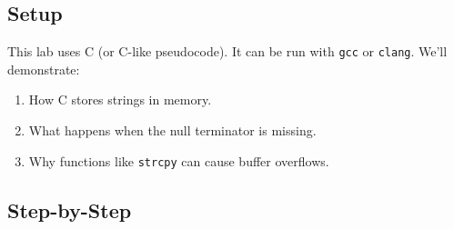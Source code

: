 \documentclass[
  letterpaper,
  DIV=11,
  numbers=noendperiod]{scrreprt}
\providecommand{\tightlist}{%
  \setlength{\itemsep}{0pt}\setlength{\parskip}{0pt}}
\begin{document}
\subsection{Setup}\label{setup-2}

This lab uses C (or C-like pseudocode). It can be run with \texttt{gcc}
or \texttt{clang}. We'll demonstrate:

\begin{enumerate}
\def\labelenumi{\arabic{enumi}.}
\tightlist
\item
  How C stores strings in memory.
\item
  What happens when the null terminator is missing.
\item
  Why functions like \texttt{strcpy} can cause buffer overflows.
\end{enumerate}

\subsection{Step-by-Step}\label{step-by-step-2}
\end{document}
